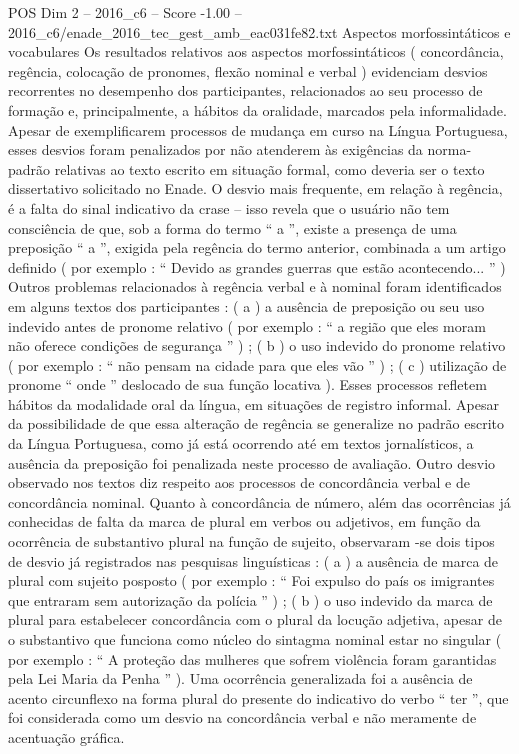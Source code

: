 \begin{textsample}{POS Dim 2 – 2016\_c6 – Score -1.00 – 2016\_c6/enade\_2016\_tec\_gest\_amb\_eac031fe82.txt}
Aspectos morfossintáticos e vocabulares Os resultados relativos aos aspectos morfossintáticos ( concordância, regência, colocação de pronomes, flexão nominal e verbal ) evidenciam desvios recorrentes no desempenho dos participantes, relacionados ao seu processo de formação e, principalmente, a hábitos da oralidade, marcados pela informalidade.
Apesar de exemplificarem processos de mudança em curso na Língua Portuguesa, esses desvios foram penalizados por não atenderem às exigências da norma-padrão relativas ao texto escrito em situação formal, como deveria ser o texto dissertativo solicitado no Enade.
O desvio mais frequente, em relação à regência, é a falta do sinal indicativo da crase – isso revela que o usuário não tem consciência de que, sob a forma do termo “ a ”, existe a presença de uma preposição “ a ”, exigida pela regência do termo anterior, combinada a um artigo definido ( por exemplo : “ Devido as grandes guerras que estão acontecendo... ” ) Outros problemas relacionados à regência verbal e à nominal foram identificados em alguns textos dos participantes : ( a ) a ausência de preposição ou seu uso indevido antes de pronome relativo ( por exemplo : “ a região que eles moram não oferece condições de segurança ” ) ; ( b ) o uso indevido do pronome relativo ( por exemplo : “ não pensam na cidade para que eles vão ” ) ; ( c ) utilização de pronome “ onde ” deslocado de sua função locativa ).
Esses processos refletem hábitos da modalidade oral da língua, em situações de registro informal.
Apesar da possibilidade de que essa alteração de regência se generalize no padrão escrito da Língua Portuguesa, como já está ocorrendo até em textos jornalísticos, a ausência da preposição foi penalizada neste processo de avaliação.
Outro desvio observado nos textos diz respeito aos processos de concordância verbal e de concordância nominal.
Quanto à concordância de número, além das ocorrências já conhecidas de falta da marca de plural em verbos ou adjetivos, em função da ocorrência de substantivo plural na função de sujeito, observaram -se dois tipos de desvio já registrados nas pesquisas linguísticas : ( a ) a ausência de marca de plural com sujeito posposto ( por exemplo : “ Foi expulso do país os imigrantes que entraram sem autorização da polícia ” ) ; ( b ) o uso indevido da marca de plural para estabelecer concordância com o plural da locução adjetiva, apesar de o substantivo que funciona como núcleo do sintagma nominal estar no singular ( por exemplo : “ A proteção das mulheres que sofrem violência foram garantidas pela Lei Maria da Penha ” ).
Uma ocorrência generalizada foi a ausência de acento circunflexo na forma plural do presente do indicativo do verbo “ ter ”, que foi considerada como um desvio na concordância verbal e não meramente de acentuação gráfica.

\end{textsample}

